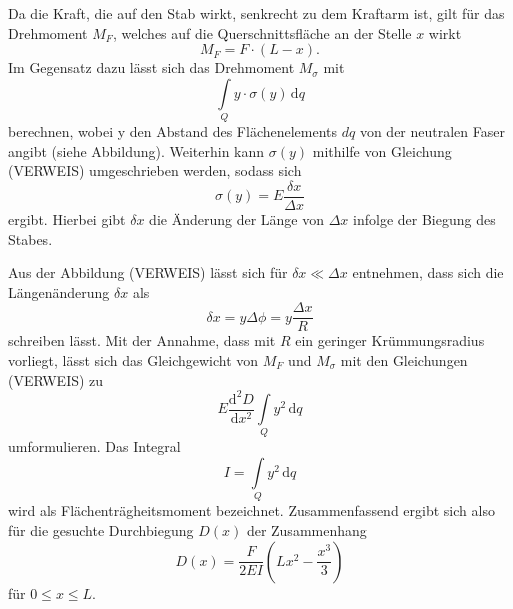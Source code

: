 Da die Kraft, die auf den Stab wirkt, senkrecht 
zu dem Kraftarm ist, gilt für das Drehmoment 
$M_F$, welches auf die Querschnittsfläche an der
Stelle $x$ wirkt
\begin{equation}
    M_F = F \cdot (L-x).
\end{equation}
\noindent
Im Gegensatz dazu lässt sich das Drehmoment 
$M_{\sigma}$ mit 
\begin{equation}
    \int\limits_Q \! y \cdot \sigma (y) \, \mathrm{d}q
\end{equation}
\noindent berechnen, wobei y den Abstand des 
Flächenelements $dq$ von der neutralen Faser
angibt (siehe Abbildung). Weiterhin kann $\sigma (y)$
mithilfe von Gleichung (VERWEIS) umgeschrieben werden,
sodass sich 
\begin{equation}
    \sigma (y) = E \frac{\delta x}{\Delta x}
\end{equation}
\noindent ergibt. Hierbei gibt $\delta x$ die 
Änderung der Länge von $\Delta x$ infolge der
Biegung des Stabes.
 
Aus der Abbildung (VERWEIS) lässt sich für 
$\delta x \ll \Delta x$ entnehmen, dass sich 
die Längenänderung $\delta x$ als 
\begin{equation}
    \delta x = y \Delta \phi = y \frac{\Delta x}{R}
\end{equation}
\noindent schreiben lässt. Mit der Annahme, dass mit 
$R$ ein geringer Krümmungsradius vorliegt, lässt sich
das Gleichgewicht von $M_F$ und $M_{\sigma}$ mit den
Gleichungen (VERWEIS) zu 
\begin{equation}
    E \frac{\mathrm{d}^2 D}{\mathrm{d} x^2} \int\limits_Q \! y^2\, \mathrm{d}q
\end{equation}
\noindent umformulieren. Das Integral
\begin{equation}
    I = \int\limits_Q \! y^2\, \mathrm{d}q
\end{equation}
\noindent wird als Flächenträgheitsmoment bezeichnet.
Zusammenfassend ergibt sich also für die gesuchte 
Durchbiegung $D(x)$ der Zusammenhang
\begin{equation}
    D(x) = \frac{F}{2 E I} \left( L x^2 - \frac{x^3}{3} \right)
\end{equation}
\noindent für $0 \leq x \leq L$.





\cite{sample}
